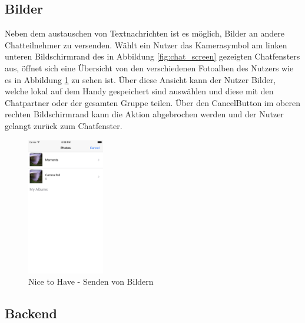\subsection{Bilder}
Neben dem austauschen von Textnachrichten ist es möglich, Bilder an andere Chatteilnehmer zu versenden. Wählt ein Nutzer das Kamerasymbol am linken unteren Bildschirmrand des in Abbildung \ref{fig:chat_screen} gezeigten Chatfensters aus, öffnet sich eine Übersicht von den verschiedenen Fotoalben des Nutzers wie es in Abbildung \ref{fig:sendphotos_screen} zu sehen ist. Über diese Ansicht kann der Nutzer Bilder, welche lokal auf dem Handy gespeichert sind auswählen und diese mit den Chatpartner oder der gesamten Gruppe teilen. Über den \glqq Cancel\grqq{-}Button im oberen rechten Bildschirmrand kann die Aktion abgebrochen werden und der Nutzer gelangt zurück zum Chatfenster.
\begin{figure}[ht]
  \centering
    \includegraphics[width=0.3\textwidth]{images/sendphotos_screen}
    \caption{Nice to Have - Senden von Bildern}
	 \label{fig:sendphotos_screen}
\end{figure}
\newpage

\subsection{Backend}



